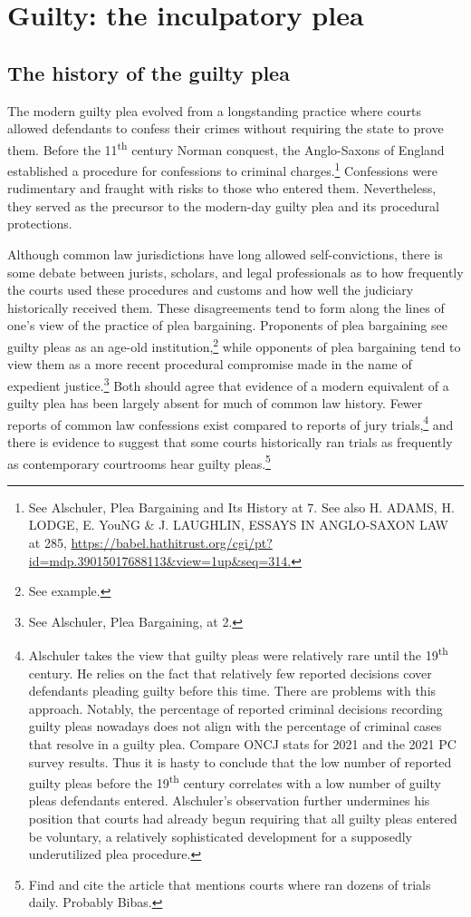 \section{Guilty: the inculpatory plea}

\subsection{The history of the guilty plea}

The modern guilty plea evolved from a longstanding practice where courts allowed defendants to confess their crimes without requiring the state to prove them. Before the 11\textsuperscript{th} century Norman conquest, the Anglo-Saxons of England established a procedure for confessions to criminal charges.\footnote{See Alschuler, Plea Bargaining and Its History at 7. See also H. ADAMS, H. LODGE, E. YouNG \& J. LAUGHLIN, ESSAYS IN ANGLO-SAXON LAW at 285, \url{https://babel.hathitrust.org/cgi/pt?id=mdp.39015017688113\&view=1up\&seq=314.}} Confessions were rudimentary and fraught with risks to those who entered them. Nevertheless, they served as the precursor to the modern-day guilty plea and its procedural protections.

Although common law jurisdictions have long allowed self-convictions, there is some debate between jurists, scholars, and legal professionals as to how frequently the courts used these procedures and customs and how well the judiciary historically received them. These disagreements tend to form along the lines of one's view of the practice of plea bargaining. Proponents of plea bargaining see guilty pleas as an age-old institution,\footnote{See example.} while opponents of plea bargaining tend to view them as a more recent procedural compromise made in the name of expedient justice.\footnote{See Alschuler, Plea Bargaining, at 2.} Both should agree that evidence of a modern equivalent of a guilty plea has been largely absent for much of common law history. Fewer reports of common law confessions exist compared to reports of jury trials,\footnote{Alschuler takes the view that guilty pleas were relatively rare until the 19\textsuperscript{th} century. He relies on the fact that relatively few reported decisions cover defendants pleading guilty before this time. There are problems with this approach. Notably, the percentage of reported criminal decisions recording guilty pleas nowadays does not align with the percentage of criminal cases that resolve in a guilty plea. Compare ONCJ stats for 2021 and the 2021 PC survey results. Thus it is hasty to conclude that the low number of reported guilty pleas before the 19\textsuperscript{th} century correlates with a low number of guilty pleas defendants entered. Alschuler's observation further undermines his position that courts had already begun requiring that all guilty pleas entered be voluntary, a relatively sophisticated development for a supposedly underutilized plea procedure.} and there is evidence to suggest that some courts historically ran trials as frequently as contemporary courtrooms hear guilty pleas.\footnote{Find and cite the article that mentions courts where ran dozens of trials daily. Probably Bibas.} 

